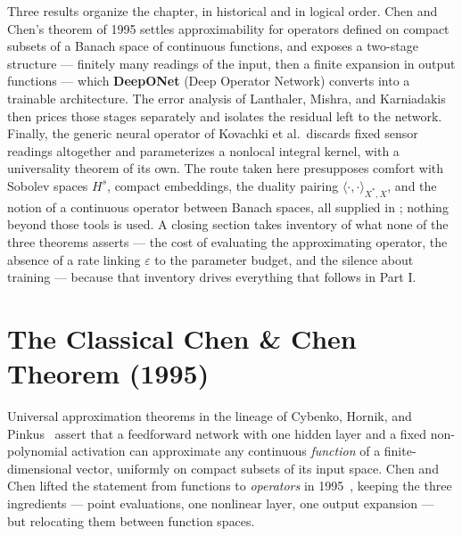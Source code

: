 Three results organize the chapter, in historical and in logical order. Chen and Chen's theorem of 1995 settles approximability for operators defined on compact subsets of a Banach space of continuous functions, and exposes a two-stage structure --- finitely many readings of the input, then a finite expansion in output functions --- which \textbf{DeepONet} (Deep Operator Network) converts into a trainable architecture. The error analysis of Lanthaler, Mishra, and Karniadakis then prices those stages separately and isolates the residual left to the network. Finally, the generic neural operator of Kovachki et al.\ discards fixed sensor readings altogether and parameterizes a nonlocal integral kernel, with a universality theorem of its own. The route taken here presupposes comfort with Sobolev spaces $H^{s}$, compact embeddings, the duality pairing $\langle\cdot,\cdot\rangle_{X^{*},X}$, and the notion of a continuous operator between Banach spaces, all supplied in ; nothing beyond those tools is used. A closing section takes inventory of what none of the three theorems asserts --- the cost of evaluating the approximating operator, the absence of a rate linking $\varepsilon$ to the parameter budget, and the silence about training --- because that inventory drives everything that follows in Part I.

\section{The Classical Chen \& Chen Theorem (1995)}

Universal approximation theorems in the lineage of Cybenko, Hornik, and Pinkus~\cite{cybenko1989approximations} assert that a feedforward network with one hidden layer and a fixed non-polynomial activation can approximate any continuous \emph{function} of a finite-dimensional vector, uniformly on compact subsets of its input space. Chen and Chen lifted the statement from functions to \emph{operators} in 1995~\cite{chen1995universal}, keeping the three ingredients --- point evaluations, one nonlinear layer, one output expansion --- but relocating them between function spaces.

